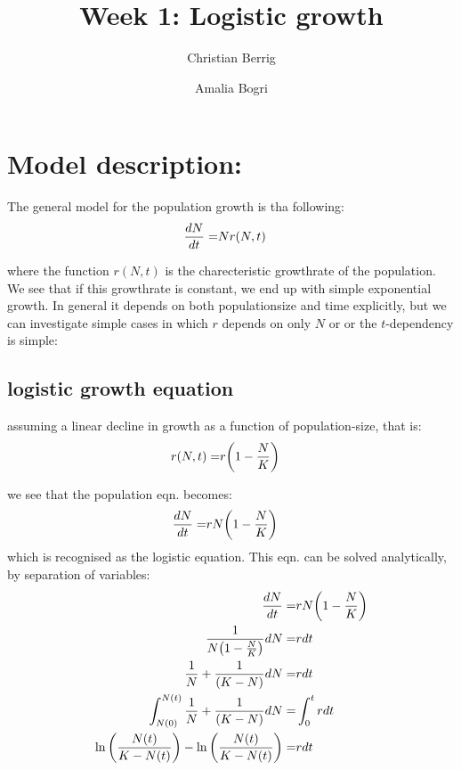 \documentclass{article}
\author{Christian Berrig \and Amalia Bogri}
\title{Week 1: Logistic growth}
\begin{document}
\maketitle


\section*{Model description:}
The general model for the population growth is tha following:
\begin{align*}
\dv{N}{t} =& N r(N, t)
\end{align*}

where the function $r(N,t)$ is the charecteristic growthrate of the population. 
We see that if this growthrate is constant, we end up with simple exponential growth. 
In general it depends on both populationsize and time explicitly, but we can investigate  simple cases in which $r$ depends on only $N$ or or the $t$-dependency is simple:

\subsection{logistic growth equation}
assuming a linear decline in growth as a function of population-size, that is:
\begin{align*}
r(N, t) =& r \qty(1 - \frac{N}{K})
\end{align*}

we see that the population eqn. becomes:
\begin{align*}
\dv{N}{t} =& r N \qty(1 - \frac{N}{K})
\end{align*}
which is recognised as the logistic equation.
This eqn. can be solved analytically, by separation of variables:
\begin{align*}
\dv{N}{t} =& r N \qty(1 - \frac{N}{K}) \\
\frac{1}{N \qty(1 - \frac{N}{K})} \dd N =& r \dd t \\
\frac{1}{N} + \frac{1}{\qty(K - N)} \dd N =& r \dd t \\
\int_{N(0)}^{N(t)} \frac{1}{N} + \frac{1}{\qty(K - N)} \dd N =& \int_{0}^{t} r \dd t \\
\ln\qty(\frac{N(t)}{K-N(t)}) - \ln\qty(\frac{N(t)}{K-N(t)})  =& r \dd t \\
\end{align*}
\end{document}
